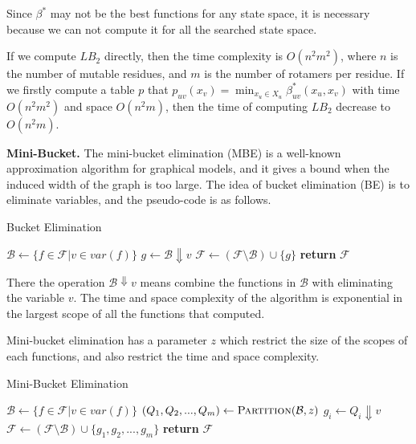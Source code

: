Since $\beta^*$ may not be the best functions for any state space, it is necessary because we can not compute it for all the searched state space.

If we compute $LB_2$ directly, then the time complexity is $O(n^2m^2)$, where $n$ is the number of mutable residues, and $m$ is the number of rotamers per residue. If we firstly compute a table $p$ that $p_{uv}(x_v)=\min_{x_u\in X_u}\beta_{uv}^*(x_u,x_v)$ with time $O(n^2m^2)$ and space $O(n^2m)$, then the time of computing $LB_2$ decrease to $O(n^2m)$.

\noindent\textbf{Mini-Bucket.}
The mini-bucket elimination (MBE) is a well-known approximation algorithm for graphical models, and it gives a bound when the induced width of the graph is too large. The idea of bucket elimination (BE) is to eliminate variables, and the pseudo-code is as follows.

\begin{algorithm}[!h]
\caption{Bucket Elimination}
\begin{algorithmic}[1]
    \State $\mathcal{B} \gets \{f\in\mathcal{F}|v\in var(f)\}$
    \State $g \gets \mathcal{B}\Downarrow v$
    \State $\mathcal{F} \gets (\mathcal{F}\setminus \mathcal{B})\cup\{g\}$
    \State \textbf{return }$\mathcal{F}$
\EndFunction
\end{algorithmic}
\end{algorithm}

There the operation $\mathcal{B}\Downarrow v$ means combine the functions in $\mathcal{B}$ with eliminating the variable $v$. The time and space complexity of the algorithm is exponential in the largest scope of all the functions that computed.

Mini-bucket elimination has a parameter $z$ which restrict the size of the scopes of each functions, and also restrict the time and space complexity.
\begin{algorithm}
\caption{Mini-Bucket Elimination}
\begin{algorithmic}[1]
    \State $\mathcal{B} \gets \{f\in\mathcal{F}|v\in var(f)\}$
    \State $(Q_1,Q_2,...,Q_m) \gets \textsc{Partition}(\mathcal{B},z)$
        \State $g_i\gets Q_i\Downarrow v$
    \EndFor
    \State $\mathcal{F} \gets (\mathcal{F}\setminus \mathcal{B})\cup\{g_1,g_2,...,g_m\}$
    \State \textbf{return }$\mathcal{F}$
\EndFunction
\end{algorithmic}
\end{algorithm}

